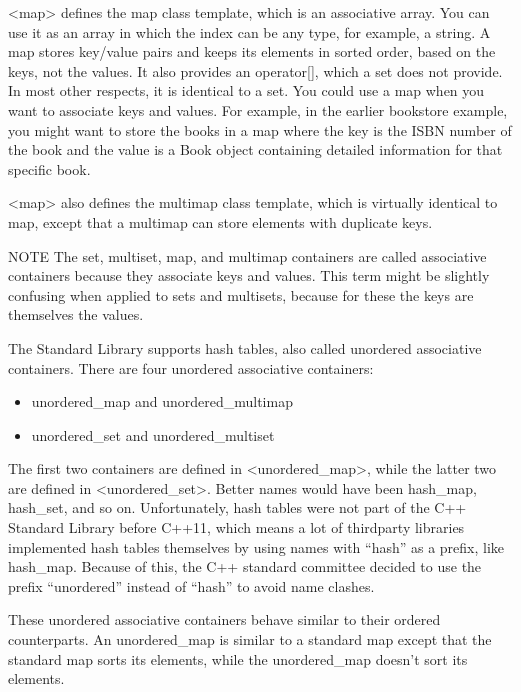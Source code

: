 <map> defines the map class template, which is an associative array. You can use it as an array in which the index can be any type, for example, a string. A map stores key/value pairs and keeps its elements in sorted order, based on the keys, not the values. It also provides an operator[], which a set does not provide. In most other respects, it is identical to a set. You could use a map when you want to associate keys and values. For example, in the earlier bookstore example, you might want to store the books in a map where the key is the ISBN number of the book and the value is a Book object containing detailed information for that specific book.


<map> also defines the multimap class template, which is virtually identical to map, except that a multimap can store elements with duplicate keys.

\begin{myNotic}{NOTE}
The set, multiset, map, and multimap containers are called associative containers because they associate keys and values. This term might be slightly confusing when applied to sets and multisets, because for these the keys are themselves the values.
\end{myNotic}


The Standard Library supports hash tables, also called unordered associative containers. There are four unordered associative containers:

\begin{itemize}
\item
unordered\_map and unordered\_multimap

\item
unordered\_set and unordered\_multiset
\end{itemize}

The first two containers are defined in <unordered\_map>, while the latter two are defined in <unordered\_set>. Better names would have been hash\_map, hash\_set, and so on. Unfortunately, hash tables were not part of the C++ Standard Library before C++11, which means a lot of thirdparty libraries implemented hash tables themselves by using names with “hash” as a prefix, like hash\_map. Because of this, the C++ standard committee decided to use the prefix “unordered” instead of “hash” to avoid name clashes.

These unordered associative containers behave similar to their ordered counterparts. An unordered\_map is similar to a standard map except that the standard map sorts its elements, while the unordered\_map doesn’t sort its elements.

